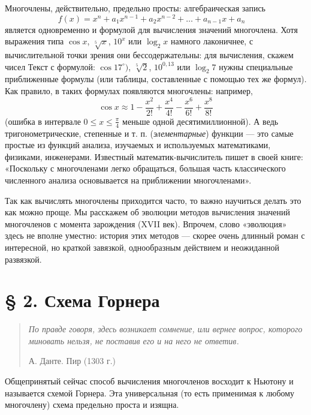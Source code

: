 \documentclass[twocolumn]{article}
\begin{document}
Многочлены, действительно, предельно просты: алгебраическая запись
\begin{equation}
   f (x) = x^n + a_1x^{n-1} + a_2x^{n-2} + \ldots + a_{n-1}x + a_n \quad
\end{equation}
является одновременно и формулой для вычисления значений многочлена. Хотя выражения типа $\cos x$, $\sqrt[5]{x}$, $10^x$ или $\log_2 x$ намного лаконичнее, с вычислительной точки зрения они бессодержательны: для вычисления, скажем чисел Текст с формулой: $\cos17^\circ)$, $\sqrt[5]{2}$, $10^{0,13}$ или $\log_2 7$ нужны специальные приближенные формулы (или таблицы, составленные с помощью тех же формул). Как правило, в таких формулах появляются многочлены: например,
\[
\cos x \approx 1 - \frac{x^2}{2!} + \frac{x^4}{4!} - \frac{x^6}{6!} + \frac{x^8}{8!}
\]
(ошибка в интервале \( 0 \leq x \leq \frac{\pi}{4} \) меньше одной десятимиллионной).
\newpage
А ведь тригонометрические, степенные и т. п. (\textit{элементарные}) функции --- это самые простые из функций анализа, изучаемых и используемых математиками, физиками, инженерами. Известный математик-вычислитель пишет в своей книге: «Поскольку с многочленами легко обращаться, большая часть классического численного анализа основывается на приближении многочленами».

Так как вычислять многочлены приходится часто, то важно научиться делать это как можно проще. Мы расскажем об эволюции методов вычисления значений многочленов с момента зарождения (XVII век). Впрочем, слово «эволюция» здесь не вполне уместно: история этих методов --- скорее очень длинный роман с интересной, но краткой завязкой, однообразным действием и неожиданной развязкой.

\section*{§ 2. Схема Горнера}
\begin{quote}
\small\textit{По правде говоря, здесь возникает сомнение, или вернее вопрос, которого миновать нельзя, не поставив его и на него не ответив.}

\hfill{А. Данте. Пир (1303 г.)}
\end{quote}

\noindent Общепринятый сейчас способ вычисления многочленов восходит к Ньютону и называется схемой Горнера. Эта универсальная (то есть применимая к любому многочлену) схема предельно проста и изящна.
\end{document}
